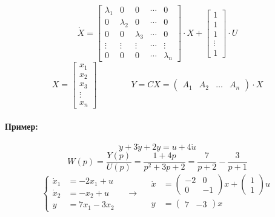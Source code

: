 \[
  \dot X = \begin{bmatrix} 
    \lambda_1 & 0 & 0 & \cdots & 0 \\
    0 & \lambda_2 & 0 & \cdots & 0 \\
    0 & 0 & \lambda_3 & \cdots & 0\\
    \vdots & \vdots & \vdots & \cdots & \vdots\\
    0 & 0 & 0 & \cdots & \lambda_n
  \end{bmatrix} \cdot X + \begin{bmatrix} 1 \\ 1\\ 1\\ \vdots \\ 1 \end{bmatrix}
  \cdot U
\] 
\[
  X = \begin{bmatrix} x_1 \\ x_2 \\ x_3 \\ \vdots \\ x_n \end{bmatrix} \qquad
  \qquad Y  = CX = \begin{pmatrix} A_1 & A_2 & \ldots & A_n \end{pmatrix} \cdot X
\] 
\paragraph{Пример:}
\[
  \ddot y + 3 \dot y + 2 y = u + 4 \dot u
\] 
\[
  W(p) = \frac{Y(p)}{U(p)} = \frac{1 + 4p}{p^2 + 3p + 2} = \frac{7}{p+2} -
  \frac{3}{p+1}
\] 
\[
  \left\{\begin{aligned} 
      \dot x_1 &= -2x_1 + u \\ \dot x_2 &= -x_2 + u \\ y &= 7x_1 - 3 x_2
  \end{aligned}\right. \quad \to \quad
  \begin{aligned}
    \dot x &= \begin{pmatrix} -2 & 0 \\ 0 & -1 \end{pmatrix} x +
    \begin{pmatrix}1 \\ 1 \end{pmatrix} u\\
    y &= \begin{pmatrix} 7 & -3 \end{pmatrix}x \\
  \end{aligned}
\] 
\centerline{\hfill\hrulefill\hrulefill\hrulefill\hfill}
